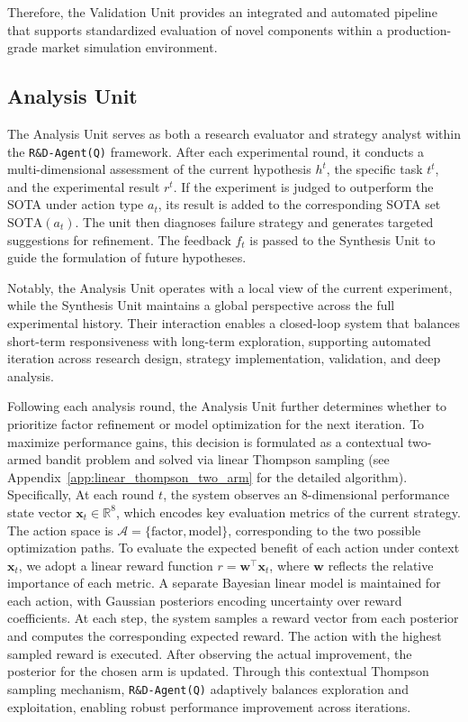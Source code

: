 \documentclass{article}
\newcommand{\name}{\texttt{R\&D-Agent(Q)}}
\begin{document}
Therefore, the Validation Unit provides an integrated and automated pipeline that supports standardized evaluation of novel components within a production-grade market simulation environment.

\subsection{Analysis Unit} \label{sec:analysis}
The Analysis Unit serves as both a research evaluator and strategy analyst within the \texttt{\name} framework. After each experimental round, it conducts a multi-dimensional assessment of the current hypothesis $h^t$, the specific task $t^t$, and the experimental result $r^t$.
If the experiment is judged to outperform the SOTA under action type $a_t$, its result is added to the corresponding SOTA set $\text{SOTA}(a_t)$. The unit then diagnoses failure strategy and generates targeted suggestions for refinement. The feedback $f_t$ is passed to the Synthesis Unit to guide the formulation of future hypotheses.

Notably, the Analysis Unit operates with a local view of the current experiment, while the Synthesis Unit maintains a global perspective across the full experimental history. Their interaction enables a closed-loop system that balances short-term responsiveness with long-term exploration, supporting automated iteration across research design, strategy implementation, validation, and deep analysis.

Following each analysis round, the Analysis Unit further determines whether to prioritize factor refinement or model optimization for the next iteration.
To maximize performance gains, this decision is formulated as a contextual two-armed bandit problem and solved via linear Thompson sampling (see Appendix~\ref{app:linear_thompson_two_arm} for the detailed algorithm).
Specifically, At each round $t$, the system observes an 8-dimensional performance state vector $\mathbf{x}_t \in \mathbb{R}^8$, which encodes key evaluation metrics of the current strategy. The action space is $\mathcal{A} = \{\text{factor}, \text{model}\}$, corresponding to the two possible optimization paths.
To evaluate the expected benefit of each action under context $\mathbf{x}_t$, we adopt a linear reward function $r = \mathbf{w}^\top \mathbf{x}_t$, where $\mathbf{w}$ reflects the relative importance of each metric. A separate Bayesian linear model is maintained for each action, with Gaussian posteriors encoding uncertainty over reward coefficients.
At each step, the system samples a reward vector from each posterior and computes the corresponding expected reward. The action with the highest sampled reward is executed.
After observing the actual improvement, the posterior for the chosen arm is updated. Through this contextual Thompson sampling mechanism, \texttt{\name} adaptively balances exploration and exploitation, enabling robust performance improvement across iterations.
\end{document}
